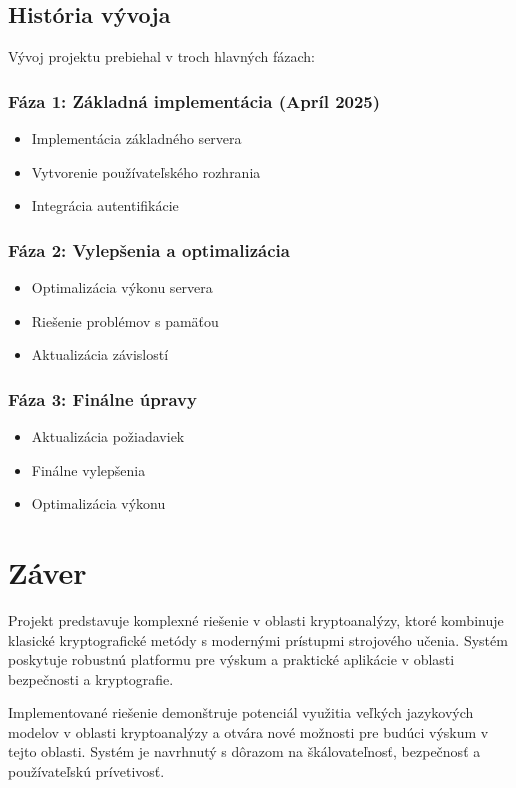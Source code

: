 \section{História vývoja}
Vývoj projektu prebiehal v troch hlavných fázach:

\subsection{Fáza 1: Základná implementácia (Apríl 2025)}
\begin{itemize}
    \item Implementácia základného servera
    \item Vytvorenie používateľského rozhrania
    \item Integrácia autentifikácie
\end{itemize}

\subsection{Fáza 2: Vylepšenia a optimalizácia}
\begin{itemize}
    \item Optimalizácia výkonu servera
    \item Riešenie problémov s pamäťou
    \item Aktualizácia závislostí
\end{itemize}

\subsection{Fáza 3: Finálne úpravy}
\begin{itemize}
    \item Aktualizácia požiadaviek
    \item Finálne vylepšenia
    \item Optimalizácia výkonu
\end{itemize}

\chapter{Záver}

Projekt predstavuje komplexné riešenie v oblasti kryptoanalýzy, ktoré kombinuje klasické kryptografické metódy s modernými prístupmi strojového učenia. Systém poskytuje robustnú platformu pre výskum a praktické aplikácie v oblasti bezpečnosti a kryptografie.

Implementované riešenie demonštruje potenciál využitia veľkých jazykových modelov v oblasti kryptoanalýzy a otvára nové možnosti pre budúci výskum v tejto oblasti. Systém je navrhnutý s dôrazom na škálovateľnosť, bezpečnosť a používateľskú prívetivosť. 